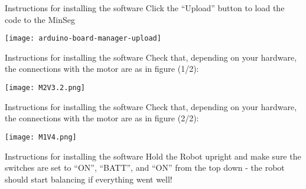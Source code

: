 \begin{frame}{Instructions for installing the software}
	Click the ``Upload'' button to load the code to the MinSeg
	\begin{center}
		\texttt{[image: arduino-board-manager-upload]}
	\end{center}
\end{frame}


\begin{frame}{Instructions for installing the software}
	Check that, depending on your hardware, the connections with the motor are as in figure (1/2):
	\begin{center}
		\texttt{[image: M2V3.2.png]}
	\end{center}
\end{frame}


\begin{frame}{Instructions for installing the software}
	Check that, depending on your hardware, the connections with the motor are as in figure (2/2):
	\begin{center}
		\texttt{[image: M1V4.png]}
	\end{center}
\end{frame}


\begin{frame}{Instructions for installing the software}
	Hold the Robot upright and make sure the switches are set to ``ON'', ``BATT'', and ``ON'' from the top down - the robot should start balancing if everything went well!
\end{frame}




\begin{frame}{}{}
	
\end{frame}




